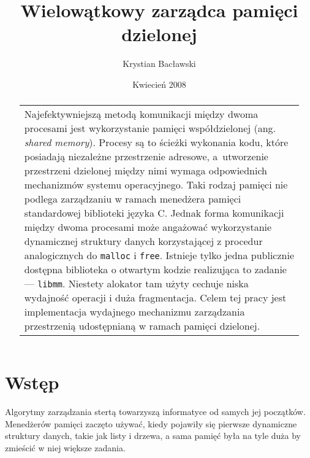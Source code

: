 \documentclass[12pt,a4paper,titlepage,twoside]{mwart}
\author{Krystian Bacławski}
\title{Wielowątkowy zarządca pamięci dzielonej}
\date{Kwiecień 2008}
\begin{document}
\maketitle
\cleardoublepage


\begin{abstract}
\vspace{2ex}
\begin{center}
\begin{tabularx}{0.75\textwidth}{X}
Najefektywniejszą metodą komunikacji między dwoma procesami jest wykorzystanie
pamięci współdzielonej (ang.  \textit{shared memory}). Procesy są to ścieżki
wykonania kodu, które posiadają niezależne przestrzenie adresowe, a~utworzenie
przestrzeni dzielonej między nimi wymaga odpowiednich mechanizmów systemu
operacyjnego. Taki rodzaj pamięci nie podlega zarządzaniu w ramach menedżera
pamięci standardowej biblioteki języka C. Jednak forma komunikacji między dwoma
procesami może angażować wykorzystanie dynamicznej struktury danych
korzystającej z procedur analogicznych do \texttt{malloc} i \texttt{free}.
Istnieje tylko jedna publicznie dostępna biblioteka o otwartym kodzie
realizująca to zadanie --- \texttt{libmm}. Niestety alokator tam użyty cechuje
niska wydajność operacji i duża fragmentacja. Celem tej pracy jest
implementacja wydajnego mechanizmu zarządzania przestrzenią udostępnianą w
ramach pamięci dzielonej. 
\end{tabularx}
\end{center}
\end{abstract}

\cleardoublepage


\tableofcontents
\cleardoublepage


\setlength{\parindent}{0pt}
\setlength{\parskip}{1.2ex plus 0.5ex minus 0.2ex}

\section{Wstęp}

Algorytmy zarządzania stertą towarzyszą informatyce od samych jej początków.
Menedżerów pamięci zaczęto używać, kiedy pojawiły się pierwsze dynamiczne
struktury danych, takie jak listy i drzewa, a sama pamięć była na tyle duża by
zmieścić w niej większe zadania.
\end{document}
